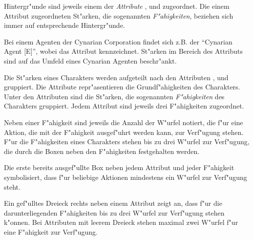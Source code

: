 \medskip
Hintergr"unde sind jeweils einem der \emph{Attribute} ,  und  zugeordnet. Die einem Attribut zugeordneten St"arken, die sogenannten \emph{F"ahigkeiten}, beziehen sich immer auf entsprechende Hintergr"unde.


\medskip
\begin{ruleexample}
    Bei einem Agenten der Cynarian Corporation findet sich z.B. der  "`Cynarian Agent [E]"', wobei \stat{[E]} das Attribut  kennzeichnet. St"arken im Bereich des Attributs sind auf das Umfeld eines Cynarian Agenten beschr"ankt.
\end{ruleexample}

Die St"arken eines Charakters werden aufgeteilt nach den Attributen ,  und  gruppiert. Die Attribute repr"asentieren die Grundf"ahigkeiten des Charakters. Unter den Attributen sind die St"arken, die sogenannten \emph{F"ahigkeiten} des Charakters gruppiert. Jedem Attribut sind jeweils drei F"ahigkeiten zugeordnet. 

Neben einer F"ahigkeit sind jeweils die Anzahl der W"urfel notiert, die f"ur eine Aktion, die mit der F"ahigkeit ausgef"uhrt werden kann, zur Verf"ugung stehen. F"ur die F"ahigkeiten eines Charakters stehen bis zu drei W"urfel zur Verf"ugung, die durch die Boxen neben den F"ahigkeiten  festgehalten werden. 

Die erste bereits ausgef"ullte Box neben jedem Attribut und jeder F"ahigkeit symbolisiert, dass f"ur beliebige Aktionen mindestens ein W"urfel zur Verf"ugung steht.

Ein gef"ulltes Dreieck rechts neben einem Attribut zeigt an, dass f"ur die darunterliegenden F"ahigkeiten bis zu drei W"urfel zur Verf"ugung stehen k"onnen. Bei Attributen mit leerem Dreieck stehen maximal zwei W"urfel f"ur eine F"ahigkeit zur Verf"ugung.



